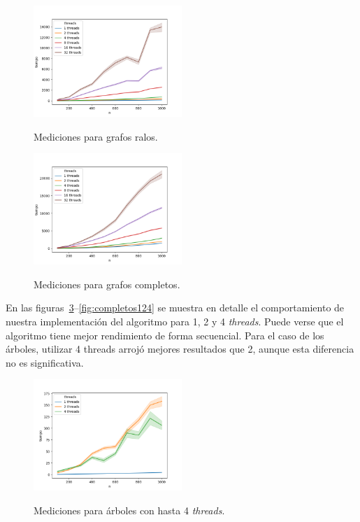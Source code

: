 \begin{figure}[h]
\caption{Mediciones para grafos ralos.}
\centering
\includegraphics[width=0.5\textwidth]{imagenes/ralo.png} \\%
\label{fig:ralos}
\end{figure}

\begin{figure}[h]
\caption{Mediciones para grafos completos.}
\centering
\includegraphics[width=0.5\textwidth]{imagenes/completo.png} \\%
\label{fig:completos}
\end{figure}


En las figuras~\ref{fig:arboles124}--\ref{fig:completos124} se muestra en
detalle el comportamiento de nuestra implementación del algoritmo para 1, 2 y 4
\textit{threads}. Puede verse que el algoritmo tiene mejor rendimiento de forma
secuencial. Para el caso de los árboles, utilizar 4 threads arrojó
mejores resultados que 2, aunque esta diferencia no es significativa.

\begin{figure}[h]
\caption{Mediciones para árboles con hasta 4 \textit{threads}.}
\centering
\includegraphics[width=0.5\textwidth]{imagenes/arbol-124.png} \\%
\label{fig:arboles124}
\end{figure}

